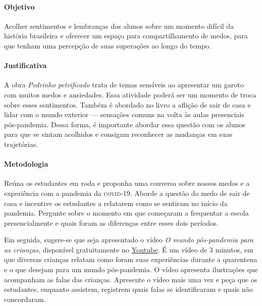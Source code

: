 \documentclass[11pt]{extarticle}
\begin{document}
\paragraph{Objetivo} Acolher sentimentos e lembranças dos alunos sobre um momento difícil da história brasileira e oferecer um espaço para compartilhamento de medos, para que tenham uma percepção de suas superações ao longo do tempo.

\paragraph{Justificativa} A obra \textit{Pedrinho petrificado} trata de temas sensíveis ao apresentar um garoto com muitos medos e ansiedades. Essa atividade poderá ser um momento de troca sobre esses sentimentos. Também é abordado no livro a aflição de sair de casa e lidar com o mundo exterior --- sensações comuns na volta às aulas presenciais pós-pandemia. Dessa forma, é importante abordar essa questão com os alunos para que se sintam acolhidos e consigam reconhecer as mudanças em suas trajetórias.

\paragraph{Metodologia} Reúna os estudantes em roda e proponha uma conversa sobre nossos medos e a experiência com a pandemia da \textsc{covid}-19. Aborde a questão do medo de sair de casa e incentive os estudantes a relatarem como se sentiram no início da pandemia. Pergunte sobre o momento em que começaram a frequentar a escola presencialmente e quais foram as diferenças entre esses dois períodos.


Em seguida, sugere-se que seja apresentado o vídeo \textit{O mundo pós-pandemia para as crianças}, disponível gratuitamente no \href{https://youtu.be/clP9tvFbqyw}{Youtube}. É um vídeo de 3 minutos, em que diversas crianças relatam como foram suas experiências durante a quarentena e o que desejam para um mundo pós-pandemia. O vídeo apresenta ilustrações que acompanham as falas das crianças. Apresente o vídeo mais uma vez e peça que os estudantes, enquanto assistem, registrem quais falas se identificaram e quais não concordaram. 

\end{document}
